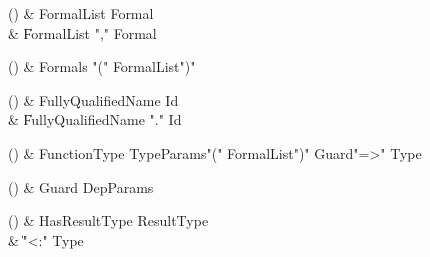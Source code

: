 \begin{bbgrammarappendix}{4.0in}

() & FormalList \label{prod:FormalList}  \: Formal  \\

 &    \| FormalList \xcd"," Formal \\

\end{bbgrammarappendix}

\begin{bbgrammarappendix}{4.3in}

() & Formals \label{prod:Formals}  \: \xcd"(" FormalList\opt \xcd")"  \\


\end{bbgrammarappendix}

\begin{bbgrammarappendix}{3.2in}

() & FullyQualifiedName \label{prod:FullyQualifiedName}  \: Id  \\

 &    \| FullyQualifiedName \xcd"." Id \\

\end{bbgrammarappendix}

\begin{bbgrammarappendix}{3.8in}

() & FunctionType \label{prod:FunctionType}  \: TypeParams\opt \xcd"(" FormalList\opt \xcd")" Guard\opt \xcd"=>" Type  \\


\end{bbgrammarappendix}

\begin{bbgrammarappendix}{4.5in}

() & Guard \label{prod:Guard}  \: DepParams  \\


\end{bbgrammarappendix}

\begin{bbgrammarappendix}{3.7in}

() & HasResultType \label{prod:HasResultType}  \: ResultType  \\

 &    \| \xcd"<:" Type \\

\end{bbgrammarappendix}

